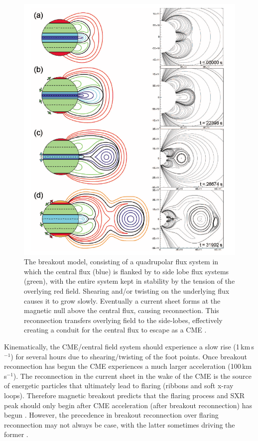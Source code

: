 \begin{figure}[!b]
\begin{center}
\includegraphics[scale=0.55]{images/lynch_breakout}
\caption{The breakout model, consisting of a quadrupolar flux system in which the central flux (blue) is flanked by to side lobe flux systems (green), with the entire system kept in stability by the tension of the overlying red field. Shearing and/or twisting on the underlying flux causes it to grow slowly. Eventually a current sheet forms at the magnetic null above the central flux, causing reconnection. This reconnection transfers overlying field to the side-lobes, effectively creating a conduit for the central flux to escape as a CME \citep{lynch2008}.}
\label{fig:breakout_model}
\end{center}
\end{figure}
\clearpage
Kinematically, the CME/central field system should experience a slow rise (1\,km\,s$^{-1}$) for several hours due to shearing/twisting of the foot points. Once breakout reconnection has begun the CME experiences a much larger acceleration (100\,km\,s$^{-1}$). The reconnection in the current sheet in the wake of the CME is the source of energetic particles that ultimately lead to flaring (ribbons and soft x-ray loops). Therefore magnetic breakout predicts that the flaring process and SXR peak should only begin after CME acceleration (after breakout reconnection) has begun \citep{lynch2004}. However, the precedence in breakout reconnection over flaring reconnection may not always be case, with the latter sometimes driving the former \citep{macneice2004}. 

